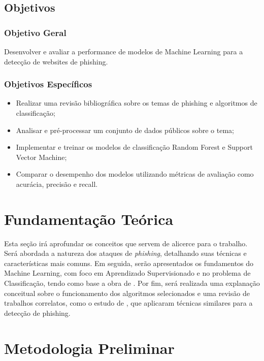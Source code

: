 \documentclass[12pt]{article}
\begin{document}
\subsection{Objetivos}
\subsubsection{Objetivo Geral}
Desenvolver e avaliar a performance de modelos de Machine Learning para a detecção de websites de phishing.

\subsubsection{Objetivos Específicos}
\begin{itemize}
    \item Realizar uma revisão bibliográfica sobre os temas de phishing e algoritmos de classificação;
    \item Analisar e pré-processar um conjunto de dados públicos sobre o tema;
    \item Implementar e treinar os modelos de classificação Random Forest e Support Vector Machine;
    \item Comparar o desempenho dos modelos utilizando métricas de avaliação como acurácia, precisão e recall.
\end{itemize}


\section{Fundamentação Teórica}
\label{sec:fundamentacao}

Esta seção irá aprofundar os conceitos que servem de alicerce para o trabalho. Será abordada a natureza dos ataques de \textit{phishing}, detalhando suas técnicas e características mais comuns. Em seguida, serão apresentados os fundamentos do Machine Learning, com foco em Aprendizado Supervisionado e no problema de Classificação, tendo como base a obra de \textcite{hastie2009elements}. Por fim, será realizada uma explanação conceitual sobre o funcionamento dos algoritmos selecionados e uma revisão de trabalhos correlatos, como o estudo de \textcite{mandadi2022}, que aplicaram técnicas similares para a detecção de phishing.


\section{Metodologia Preliminar}
\label{sec:metodologia}
\end{document}
